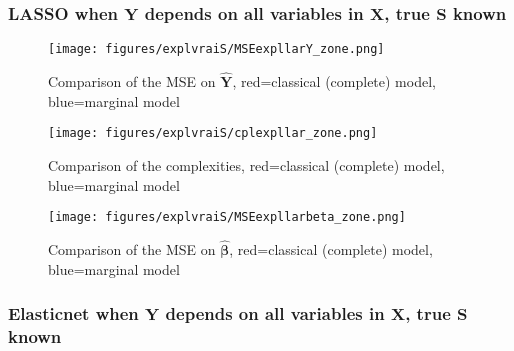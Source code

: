 \documentclass[12pt,a4paper]{report}
\begin{document}
%	
%	
\subsubsection{LASSO when $\boldsymbol{Y}$ depends on all variables in $\boldsymbol{X}$, true $\boldsymbol{S}$ known}
	\begin{figure}[h!]
	\centering
		  \texttt{[image: figures/explvraiS/MSEexpllarY\_zone.png]}
		\caption{Comparison of the MSE on $\hat{\boldsymbol{Y}}$, red=classical (complete) model, blue=marginal model}\label{MSEexpllarY_zone}
	\end{figure}
	\begin{figure}[h!]
	\centering
		  \texttt{[image: figures/explvraiS/cplexpllar\_zone.png]}
		\caption{Comparison of the complexities, red=classical (complete) model, blue=marginal model}\label{cplexpllar_zone}
	\end{figure}
	\begin{figure}[h!]
	\centering
		  \texttt{[image: figures/explvraiS/MSEexpllarbeta\_zone.png]}
		\caption{Comparison of the MSE on $\hat{\boldsymbol{\beta}}$, red=classical (complete) model, blue=marginal model}\label{MSEexpllarbeta_zone}
	\end{figure}
	\FloatBarrier
\newpage
\subsubsection{Elasticnet when $\boldsymbol{Y}$ depends on all variables in $\boldsymbol{X}$, true $\boldsymbol{S}$ known}
\end{document}
